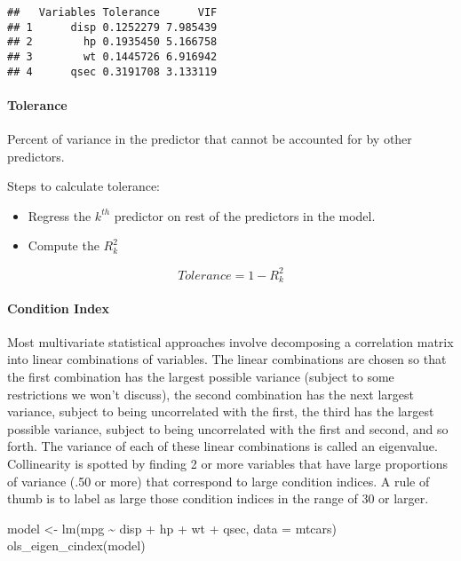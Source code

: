 \documentclass[
]{article}
\newenvironment{Shaded}{\begin{snugshade}}{\end{snugshade}}
\newcommand{\AttributeTok}[1]{\textcolor[rgb]{0.77,0.63,0.00}{#1}}
\newcommand{\FunctionTok}[1]{\textcolor[rgb]{0.00,0.00,0.00}{#1}}
\newcommand{\NormalTok}[1]{#1}
\newcommand{\OtherTok}[1]{\textcolor[rgb]{0.56,0.35,0.01}{#1}}
\newcommand{\SpecialCharTok}[1]{\textcolor[rgb]{0.00,0.00,0.00}{#1}}
\providecommand{\tightlist}{%
  \setlength{\itemsep}{0pt}\setlength{\parskip}{0pt}}
\begin{document}
\begin{verbatim}
##   Variables Tolerance      VIF
## 1      disp 0.1252279 7.985439
## 2        hp 0.1935450 5.166758
## 3        wt 0.1445726 6.916942
## 4      qsec 0.3191708 3.133119
\end{verbatim}

\hypertarget{tolerance}{%
\paragraph{Tolerance}\label{tolerance}}

Percent of variance in the predictor that cannot be accounted for by
other predictors.

Steps to calculate tolerance:

\begin{itemize}
\tightlist
\item
  Regress the \(k^{th}\) predictor on rest of the predictors in the
  model.
\item
  Compute the \({R}^{2}_{k}\)
\end{itemize}

\[Tolerance = 1 - {R}^{2}_{k}\]

\hypertarget{condition-index}{%
\paragraph{Condition Index}\label{condition-index}}

Most multivariate statistical approaches involve decomposing a
correlation matrix into linear combinations of variables. The linear
combinations are chosen so that the first combination has the largest
possible variance (subject to some restrictions we won't discuss), the
second combination has the next largest variance, subject to being
uncorrelated with the first, the third has the largest possible
variance, subject to being uncorrelated with the first and second, and
so forth. The variance of each of these linear combinations is called an
eigenvalue. Collinearity is spotted by finding 2 or more variables that
have large proportions of variance (.50 or more) that correspond to
large condition indices. A rule of thumb is to label as large those
condition indices in the range of 30 or larger.

\begin{Shaded}
\begin{Highlighting}[]
\NormalTok{model }\OtherTok{\textless{}{-}} \FunctionTok{lm}\NormalTok{(mpg }\SpecialCharTok{\textasciitilde{}}\NormalTok{ disp }\SpecialCharTok{+}\NormalTok{ hp }\SpecialCharTok{+}\NormalTok{ wt }\SpecialCharTok{+}\NormalTok{ qsec, }\AttributeTok{data =}\NormalTok{ mtcars)}
\FunctionTok{ols\_eigen\_cindex}\NormalTok{(model)}
\end{Highlighting}
\end{Shaded}
\end{document}
